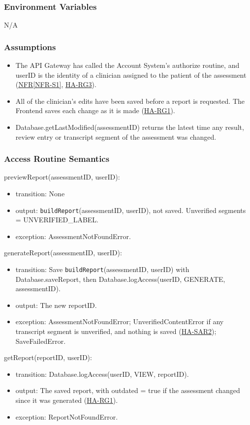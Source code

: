 \documentclass[12pt, titlepage]{article}
\newcommand{\srsref}[2]{\href{https://github.com/Nour-Fawaz/MacaBoca/blob/main/pdfs/SRS/SRS.pdf}{#1\ref*{#2}}}
\newcommand{\hazref}[1]{\href{https://github.com/Nour-Fawaz/MacaBoca/blob/main/pdfs/HazardAnalysis/HazardAnalysis.pdf}{#1}}
\begin{document}
\subsubsection{Environment Variables}
N/A

\subsubsection{Assumptions}
\begin{itemize}
\item The API Gateway has called the Account System's authorize routine, and userID is the identity of a clinician assigned to the patient of the assessment (\srsref{NFR}{NFR-S1}, \hazref{HA-RG3}).
\item All of the clinician's edits have been saved before a report is requested. The Frontend saves each change as it is made (\hazref{HA-RG1}).
\item Database.getLastModified(assessmentID) returns the latest time any result, review entry or transcript segment of the assessment was changed.
\end{itemize}

\subsubsection{Access Routine Semantics}

\noindent previewReport(assessmentID, userID):
\begin{itemize}
\item transition: None
\item output: \texttt{buildReport}(assessmentID, userID), not saved. Unverified segments = UNVERIFIED\_LABEL.
\item exception: AssessmentNotFoundError.
\end{itemize}

\noindent generateReport(assessmentID, userID):
\begin{itemize}
\item transition: Save \texttt{buildReport}(assessmentID, userID) with Database.saveReport, then Database.logAccess(userID, GENERATE, assessmentID).
\item output: The new reportID.
\item exception: AssessmentNotFoundError; UnverifiedContentError if any transcript segment is unverified, and nothing is saved (\hazref{HA-SAR2}); SaveFailedError.
\end{itemize}

\noindent getReport(reportID, userID):
\begin{itemize}
\item transition: Database.logAccess(userID, VIEW, reportID).
\item output: The saved report, with outdated = true if the assessment changed since it was generated (\hazref{HA-RG1}).
\item exception: ReportNotFoundError.
\end{itemize}
\end{document}

